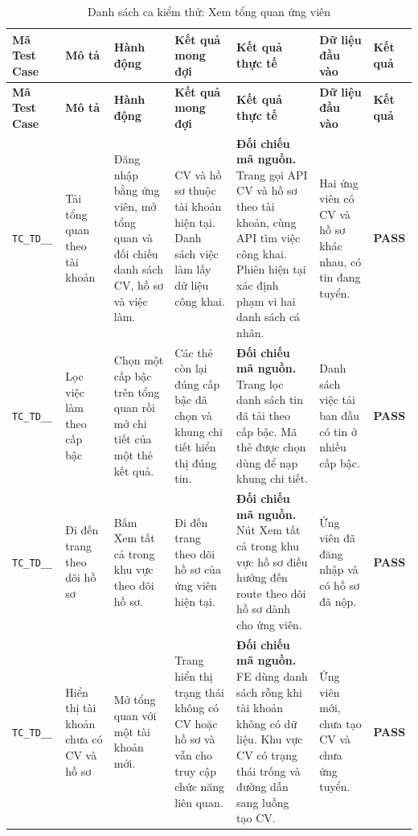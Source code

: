 \begin{landscape}
{
\fontsize{9.5}{11.5}\selectfont
\setlength{\tabcolsep}{3pt}
\renewcommand{\arraystretch}{1.2}
\begin{longtable}{|>{\raggedright\arraybackslash}p{2.1cm}|>{\raggedright\arraybackslash}p{2.8cm}|>{\raggedright\arraybackslash}p{3.8cm}|>{\raggedright\arraybackslash}p{4.0cm}|>{\raggedright\arraybackslash}p{5.0cm}|>{\raggedright\arraybackslash}p{3.2cm}|>{\centering\arraybackslash}p{1.3cm}|}
    \caption{Danh sách ca kiểm thử: Xem tổng quan ứng viên} \label{tab:ts-td-06} \\
    \hline
    \textbf{Mã Test Case} & \textbf{Mô tả} & \textbf{Hành động} & \textbf{Kết quả mong đợi} & \textbf{Kết quả thực tế} & \textbf{Dữ liệu đầu vào} & \textbf{Kết quả} \\
    \hline
    \endfirsthead
    \hline
    \textbf{Mã Test Case} & \textbf{Mô tả} & \textbf{Hành động} & \textbf{Kết quả mong đợi} & \textbf{Kết quả thực tế} & \textbf{Dữ liệu đầu vào} & \textbf{Kết quả} \\
    \hline
    \endhead
    \hline
    \endfoot
    \hline
    \endlastfoot
    \texttt{TC\_\allowbreak TD\_\allowbreak 06\_\allowbreak 01} & Tải tổng quan theo tài khoản & Đăng nhập bằng ứng viên, mở tổng quan và đối chiếu danh sách CV, hồ sơ và việc làm. & CV và hồ sơ thuộc tài khoản hiện tại. Danh sách việc làm lấy dữ liệu công khai. & \textbf{Đối chiếu mã nguồn.} Trang gọi API CV và hồ sơ theo tài khoản, cùng API tìm việc công khai. Phiên hiện tại xác định phạm vi hai danh sách cá nhân. & Hai ứng viên có CV và hồ sơ khác nhau, có tin đang tuyển. & \textbf{PASS} \\
    \hline
    \texttt{TC\_\allowbreak TD\_\allowbreak 06\_\allowbreak 02} & Lọc việc làm theo cấp bậc & Chọn một cấp bậc trên tổng quan rồi mở chi tiết của một thẻ kết quả. & Các thẻ còn lại đúng cấp bậc đã chọn và khung chi tiết hiển thị đúng tin. & \textbf{Đối chiếu mã nguồn.} Trang lọc danh sách tin đã tải theo cấp bậc. Mã thẻ được chọn dùng để nạp khung chi tiết. & Danh sách việc tải ban đầu có tin ở nhiều cấp bậc. & \textbf{PASS} \\
    \hline
    \texttt{TC\_\allowbreak TD\_\allowbreak 06\_\allowbreak 03} & Đi đến trang theo dõi hồ sơ & Bấm Xem tất cả trong khu vực theo dõi hồ sơ. & Đi đến trang theo dõi hồ sơ của ứng viên hiện tại. & \textbf{Đối chiếu mã nguồn.} Nút Xem tất cả trong khu vực hồ sơ điều hướng đến route theo dõi hồ sơ dành cho ứng viên. & Ứng viên đã đăng nhập và có hồ sơ đã nộp. & \textbf{PASS} \\
    \hline
    \texttt{TC\_\allowbreak TD\_\allowbreak 06\_\allowbreak 04} & Hiển thị tài khoản chưa có CV và hồ sơ & Mở tổng quan với một tài khoản mới. & Trang hiển thị trạng thái không có CV hoặc hồ sơ và vẫn cho truy cập chức năng liên quan. & \textbf{Đối chiếu mã nguồn.} FE dùng danh sách rỗng khi tài khoản không có dữ liệu. Khu vực CV có trạng thái trống và đường dẫn sang luồng tạo CV. & Ứng viên mới, chưa tạo CV và chưa ứng tuyển. & \textbf{PASS} \\
    \hline
\end{longtable}
}


\end{landscape}
